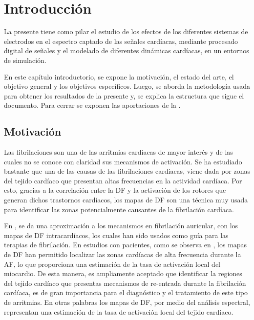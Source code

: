 
\chapter{Introducción}
\begin{resumen}
La presente \nombreDoc tiene como pilar el estudio de los efectos de los
diferentes sistemas de electrodos en el espectro captado de las señales cardíacas,
mediante procesado digital de señales y el modelado de diferentes dinámicas
cardíacas, en un entornos de simulación.

En este capítulo introductorio, se expone la motivación, el estado del arte, el
objetivo general y los objetivos específicos. Luego, se
aborda la metodología usada para obtener los resultados de la
presente \nombreDoc y, se explica la estructura que sigue el
documento. Para cerrar se exponen las aportaciones de la \nombreDoc.



\end{resumen}


\medskip %




\section{Motivación}
Las fibrilaciones son una de las arritmias cardíacas de mayor interés y de las
cuales no se conoce con claridad sus mecanismos de activación. Se ha estudiado
bastante que una de las causas de las fibrilaciones cardíacas, viene dada por
zonas del tejido cardíaco que presentan altas frecuencias en la actividad
cardíaca. Por esto, gracias a la correlación entre la \ac{DF} y la activación de
los rotores que generan dichos trastornos cardíacos, los mapas de \ac{DF} son
una técnica muy usada para identificar las zonas potencialmente causantes de la
fibrilación cardíaca.

En \cite{Berenfeld10}, se da una  aproximación a los mecanismos en fibrilación
auricular, con los mapas de \ac{DF} intracardíacos, los cuales han sido usados
como guía para las terapias de fibrilación. En estudios con pacientes,  como se
observa en \cite{Sanders05, atienza2009, atienza2011, kumagai2013, okumura2012},
los mapas de \ac{DF} han permitido localizar las zonas cardíacas de alta
frecuencia durante la \ac{AF}, lo que proporciona una estimación de la tasa de
activación local del miocardio. De esta manera, es ampliamente aceptado que
identificar la regiones del tejido cardíaco que presentas mecanismos de
re-entrada durante la fibrilación cardíaca, es de gran importancia para el
diagnóstico y el tratamiento de este tipo de arritmias. En otras palabras los
mapas de \ac{DF}, por medio del análisis espectral, representan una estimación
de la tasa de activación local del tejido cardíaco.


